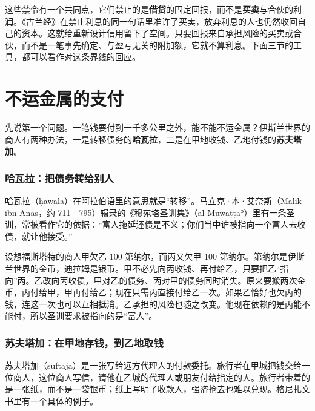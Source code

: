 这些禁令有一个共同点，它们禁止的是\textbf{借贷}的固定回报，而不是\textbf{买卖}与合伙的利润。《古兰经》在禁止利息的同一句话里准许了买卖，放弃利息的人也仍然收回自己的资本。这就给重新设计信用留下了空间。只要回报来自承担风险的买卖或合伙，而不是一笔事先确定、与盈亏无关的附加额，它就不算利息。下面三节的工具，都可以看作对这条界线的回应。

\section{不运金属的支付}\label{sec:islamic-transfer}

先说第一个问题。一笔钱要付到一千多公里之外，能不能不运金属？伊斯兰世界的商人有两种办法，一是转移债务的\textbf{哈瓦拉}，二是在甲地收钱、乙地付钱的\textbf{苏夫塔加}。

\subsubsection{哈瓦拉：把债务转给别人}
哈瓦拉（ḥawāla）在阿拉伯语里的意思就是“转移”\cite{maimbo2003}。马立克·本·艾奈斯（Mālik ibn Anas，约 711—795）辑录的《穆宛塔圣训集》（al-Muwaṭṭaʾ）里有一条圣训，常被看作它的依据：“富人拖延还债是不义；你们当中谁被指向一个富人去收债，就让他接受。”\cite{muwatta}

设想福斯塔特的商人甲欠乙 100 第纳尔，而丙又欠甲 100 第纳尔。第纳尔是伊斯兰世界的金币，迪拉姆是银币。甲不必先向丙收钱、再付给乙，只要把乙“指向”丙。乙改向丙收债，甲对乙的债务、丙对甲的债务同时消失。原来要搬两次金币，丙付给甲，甲再付给乙；现在只需丙直接付给乙一次。如果乙恰好也欠丙的钱，连这一次也可以互相抵消。乙承担的风险也随之改变。他现在依赖的是丙能不能付，所以圣训要求被指向的是“富人”。

\subsubsection{苏夫塔加：在甲地存钱，到乙地取钱}
苏夫塔加（suftaja）是一张写给远方代理人的付款委托。旅行者在甲城把钱交给一位商人，这位商人写信，请他在乙城的代理人或朋友付给指定的人。旅行者带着的是一张纸，而不是一袋银币；纸上写明了收款人，强盗抢去也难以兑现。格尼扎文书里有一个具体的例子。

